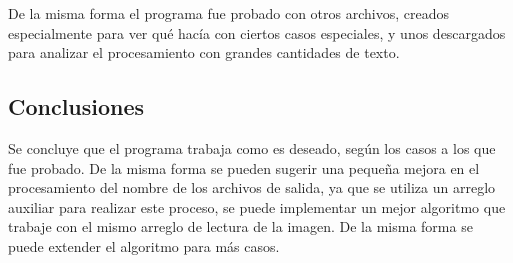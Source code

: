 \documentclass[12pt]{article}
\begin{document}
De la misma forma el programa fue probado con otros archivos, creados especialmente para ver qué hacía con ciertos casos especiales, y unos descargados para analizar el procesamiento con grandes cantidades de texto.

\subsection{Conclusiones}
Se concluye que el programa trabaja como es deseado, según los casos a los que fue probado. De la misma forma se pueden sugerir una pequeña mejora en el procesamiento del nombre de los archivos de salida, ya que se utiliza un arreglo auxiliar para realizar este proceso, se puede implementar un mejor algoritmo que trabaje con el mismo arreglo de lectura de la imagen. De la misma forma se puede extender el algoritmo para más casos.
\end{document}
